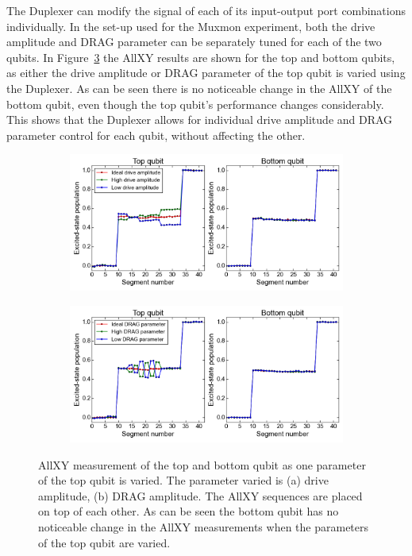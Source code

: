         The Duplexer can modify the signal of each of its input-output port combinations individually. In the set-up used for the Muxmon experiment, both the drive amplitude and DRAG parameter can be separately tuned for each of the two qubits. In Figure~\ref{fig:AllXY individual control} the AllXY results are shown for the top and bottom qubits, as either the drive amplitude or DRAG parameter of the top qubit is varied using the Duplexer. As can be seen there is no noticeable change in the AllXY of the bottom qubit, even though the top qubit's performance changes considerably. This shows that the Duplexer allows for individual drive amplitude and DRAG parameter control for each qubit, without affecting the other.

        \begin{figure}
        \centering
           \begin{subfigure}[b]{\textwidth}
           \includegraphics[width=1\linewidth]{../Figures/Exploring frequency re-use/AllXY_drive_top.png}
           \caption{}
           \label{fig:AllXY drive top}
        \end{subfigure}

        \begin{subfigure}[b]{\textwidth}
           \includegraphics[width=1\linewidth]{../Figures/Exploring frequency re-use/AllXY_drag_top.png}
           \caption{}
           \label{fig:AllXY DRAG top}
        \end{subfigure}

        \caption[Two numerical solutions]{AllXY measurement of the top and bottom qubit as one parameter of the top qubit is varied. The parameter varied is (a) drive amplitude, (b) DRAG amplitude. The AllXY sequences are placed on top of each other. As can be seen the bottom qubit has no noticeable change in the AllXY measurements when the parameters of the top qubit are varied.}
        \label{fig:AllXY individual control}
        \end{figure}

